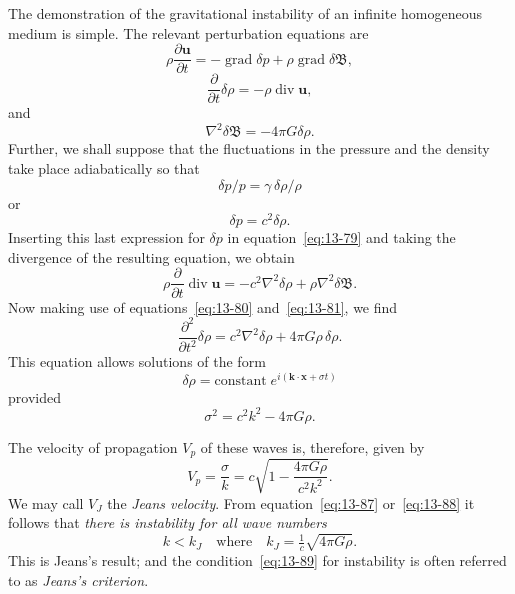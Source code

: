 The demonstration of the gravitational instability of an infinite homogeneous medium is simple. The relevant perturbation equations are
\begin{equation}
\label{eq:13-79}
\rho\frac{\partial\mathbf{u}}{\partial t} = -\operatorname{grad}\delta p + \rho\operatorname{grad}\delta\mathfrak{B},
\end{equation}
\begin{equation}
\label{eq:13-80}
\frac{\partial}{\partial t}\delta\rho = -\rho\operatorname{div}\mathbf{u},
\end{equation}
and
\begin{equation}
\label{eq:13-81}
\nabla^2\delta\mathfrak{B} = -4\pi G\delta\rho.
\end{equation}
Further, we shall suppose that the fluctuations in the pressure and the density take place adiabatically so that
\begin{equation}
\label{eq:13-82}
\delta p/p = \gamma\,\delta\rho/\rho
\end{equation}
or
\begin{equation}
\label{eq:13-83}
\delta p = c^2\delta\rho.
\end{equation}
Inserting this last expression for $\delta p$ in equation~\eqref{eq:13-79} and taking the divergence of the resulting equation, we obtain
\begin{equation}
\label{eq:13-84}
\rho\frac{\partial}{\partial t}\operatorname{div}\mathbf{u} = -c^2\nabla^2\delta\rho + \rho\nabla^2\delta\mathfrak{B}.
\end{equation}
Now making use of equations~\eqref{eq:13-80} and~\eqref{eq:13-81}, we find
\begin{equation}
\label{eq:13-85}
\frac{\partial^2}{\partial t^2}\delta\rho = c^2\nabla^2\delta\rho + 4\pi G\rho\,\delta\rho.
\end{equation}
This equation allows solutions of the form
\begin{equation}
\label{eq:13-86}
\delta\rho = \text{constant}\; e^{i(\mathbf{k}\cdot\mathbf{x}+\sigma t)}
\end{equation}
provided
\begin{equation}
\label{eq:13-87}
\sigma^2 = c^2 k^2 - 4\pi G\rho.
\end{equation}

The velocity of propagation $V_p$ of these waves is, therefore, given by
\begin{equation}
\label{eq:13-88}
V_p = \frac{\sigma}{k} = c\sqrt{1-\frac{4\pi G\rho}{c^2 k^2}}.
\end{equation}
We may call $V_J$ the \textit{Jeans velocity}. From equation~\eqref{eq:13-87} or~\eqref{eq:13-88} it follows that \textit{there is instability for all wave numbers}
\begin{equation}
\label{eq:13-89}
k < k_J \quad \text{where} \quad k_J = \tfrac{1}{c}\sqrt{4\pi G\rho}.
\end{equation}
This is Jeans's result; and the condition~\eqref{eq:13-89} for instability is often referred to as \textit{Jeans's criterion}.

